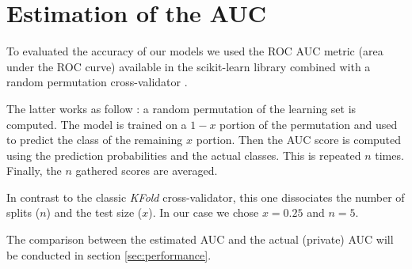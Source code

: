 \section{Estimation of the AUC}\label{sec:AUC}
To evaluated the accuracy of our models we used the ROC AUC metric (area under the ROC curve) available in the scikit-learn library \cite{scikit-roc-auc-score} combined with a random permutation cross-validator \cite{scikit-shufflesplit}.

The latter works as follow : a random permutation of the learning set is computed. The model is trained on a $1 - x$ portion of the permutation and used to predict the class of the remaining $x$ portion. Then the AUC score is computed using the prediction probabilities and the actual classes. This is repeated $n$ times. Finally, the $n$ gathered scores are averaged.

In contrast to the classic \emph{KFold} cross-validator, this one dissociates the number of splits ($n$) and the test size ($x$). In our case we chose $x = 0.25$ and $n = 5$.

The comparison between the estimated AUC and the actual (private) AUC will be conducted in section \ref{sec:performance}.
